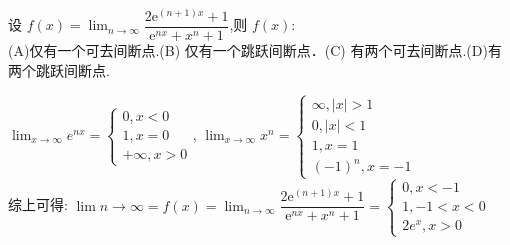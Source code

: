 \documentclass[8pt a4paper, oneside, UTF8]{ctexbook}
\begin{document}
\begin{sloppypar}
\begin{problem}
        设 $f(x)=\lim_{n\to\infty}\dfrac{2\mathrm{e}^{(n+1)x}+1}{\mathrm{e}^{nx}+x^{n}+1}$,则 $f(x):$  \\
        (A)仅有一个可去间断点.\quad(B) 仅有一个跳跃间断点．\quad(C) 有两个可去间断点.\quad(D)有两个跳跃间断点.
    \end{problem}
    \begin{solution}
        $\lim_{x\to \infty}e^{nx}=\begin{cases}
            0,x<0\\
            1,x=0\\
            +\infty,x>0
        \end{cases}$,
        $\lim_{x \to \infty}x^n=\begin{cases}
            \infty ,|x|>1\\ 
            0,|x|<1\\1,
            x=1\\
            (-1)^n,x=-1
        \end{cases}$
    \\综上可得:
    $
    \lim{n\to\infty}=f(x)=\lim_{n\to\infty}\dfrac{2\mathrm{e}^{(n+1)x}+1}{\mathrm{e}^{nx}+x^{n}+1}=\begin{cases}
        0,x<-1\\1,-1<x<0\\2e^x,x>0
    \end{cases}
    $
    \end{solution}
    \ifx\allfiles\undefined
\end{sloppypar}
\end{document}
